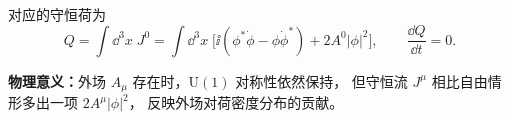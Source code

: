 \begin{question}[复标量电子场]
\begin{solution}

对应的守恒荷为
\[
Q=\int\dd^{3}x\;J^{0}
=\int\dd^{3}x\;\bigl[\ii(\phi^{*}\dot\phi-\phi\dot\phi^{*})+2A^{0}|\phi|^{2}\bigr],
\qquad \frac{\dd Q}{\dd t}=0.
\]

\textbf{物理意义：}外场 $A_{\mu}$ 存在时，$\mathrm{U}(1)$ 对称性依然保持，
但守恒流 $J^{\mu}$ 相比自由情形多出一项 $2A^{\mu}|\phi|^{2}$，
反映外场对荷密度分布的贡献。

\end{solution}
\end{question}

\clearpage
